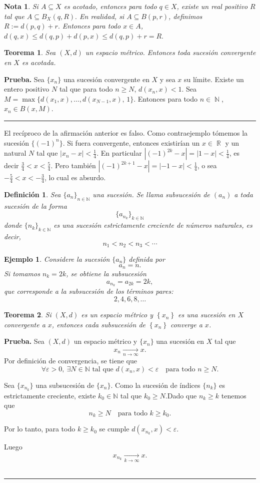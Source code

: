 \documentclass[x11names, 12pt]{book}
\newtheorem{definicion}{Definición}
\newtheorem{teorema}{Teorema}
\newtheorem{example}{Ejemplo}
\newtheorem{remark}{Nota}
\newenvironment{prueba}[1][Prueba]{\noindent\textbf{#1.} }{\ \rule{0.5em}{0.5em}}
\DeclareMathOperator{\ene}{\mathbb{N}}
\DeclareMathOperator{\R}{\mathbb{R}}
\begin{document}
\begin{remark}
Si $A\subseteq X$ es acotado, entonces para todo $q\in X$, existe un real positivo $R$ tal que $A\subseteq B_X(q,R).$ En realidad, si $A\subseteq B(p, r)$, definimos $R:=d(p,q)+r.$ Entonces para todo $x\in A$, $d(q,x)\leq d(q,p)+d(p,x)\leq d(q,p)+r=R.$
\end{remark}

\begin{teorema}
Sea $(X,d)$ un espacio métrico. Entonces toda sucesión convergente en $X$ es acotada.
\end{teorema}
\begin{prueba}
Sea $\{x_n\}$ una sucesión convergente en $X$ y sea $x$ su límite. Existe un entero positivo $N$ tal que para todo $n\geq N$, $d(x_n, x)<1.$ Sea $M=\max\{d(x_1,  x), \dots , d(x_{N-1},  x), \, 1\}.$ Entonces para todo $n\in \ene$, $x_n\in B(x, M).$
\end{prueba}

El recíproco de la afirmación anterior es falso. Como contraejemplo tómemos la sucesión $\{(-1)^n\}$. Si fuera convergente, entonces existirían un $x\in \R$ y un natural $N$ tal que $|x_n-x|<\frac{1}{4}$. En particular $|(-1)^{2k}-x|=|1-x|<\frac{1}{4}$, es decir $\frac{3}4<x<\frac{5}4$. Pero también $|(-1)^{2k+1}-x|=|-1-x|<\frac{1}{4}$, o sea $-\frac{5}4<x<-\frac{3}4$, lo cual es absurdo.
\begin{definicion}
Sea $\{a_n\}_{n\in\mathbb{N}}$ una sucesión.  
Se llama \emph{subsucesión} de $(a_n)$ a toda sucesión de la forma
\[
\{a_{n_k}\}_{k\in\mathbb{N}}
\]
donde $\{n_k\}_{k\in\mathbb{N}}$ es una sucesión estrictamente creciente de números naturales, es decir,
\[
n_1 < n_2 < n_3 < \cdots
\]
\end{definicion}
\begin{example}
    Considere la sucesión $\{a_n\}$ definida por
\[
a_n = n.
\]
Si tomamos $n_k = 2k$, se obtiene la subsucesión
\[
a_{n_k} = a_{2k} = 2k,
\]
que corresponde a la subsucesión de los términos pares:
\[
2, 4, 6, 8, \dots
\]
\end{example}

\begin{teorema}
    Si $(X,d)$ es un espacio m\'etrico y $\left\{x_n\right\}$ es una sucesi\'on en $X$ convergente a $x$, entonces cada subsucesi\'on de $\left\{x_n\right\}$ converge a $x$.
\end{teorema}
\begin{prueba}
    Sea $(X,d)$ un espacio métrico y $\{x_n\}$ una sucesión en $X$ tal que
\[
x_n \xrightarrow[n\to\infty]{} x.
\]
Por definición de convergencia, se tiene que
\[
\forall \varepsilon > 0,\ \exists N \in \mathbb{N} \text{ tal que } d(x_n,x) < \varepsilon
\quad \text{para todo } n \ge N.
\]

Sea $\{x_{n_k}\}$ una subsucesión de $\{x_n\}$.  
Como la sucesión de índices $\{n_k\}$ es estrictamente creciente, existe $k_0 \in \mathbb{N}$ tal que $k_0\ge N$.Dado que $n_k\ge k$ tenemos que
\[
n_k \ge N \quad \text{para todo } k \ge k_0.
\]

Por lo tanto, para todo $k \ge k_0$ se cumple
$d(x_{n_k}, x) < \varepsilon.$


Luego
\[
x_{n_k} \xrightarrow[k\to\infty]{} x.
\]
\end{prueba}
\end{document}
